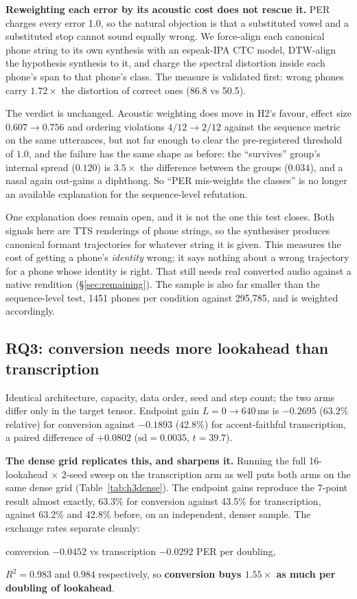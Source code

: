 \documentclass{article}
\begin{document}
\textbf{Reweighting each error by its acoustic cost does not rescue it.} PER
charges every error 1.0, so the natural objection is that a substituted vowel
and a substituted stop cannot sound equally wrong. We force-align each
canonical phone string to its own synthesis with an espeak-IPA CTC model,
DTW-align the hypothesis synthesis to it, and charge the spectral distortion
inside each phone's span to that phone's class. The measure is validated first:
wrong phones carry $1.72\times$ the distortion of correct ones (86.8 vs 50.5).

The verdict is unchanged. Acoustic weighting does move
in H2's favour, effect size $0.607 \rightarrow 0.756$ and ordering violations
$4/12 \rightarrow 2/12$ against the sequence metric on the same utterances,
but not far enough to clear the pre-registered threshold of $1.0$, and the
failure has the same shape as before: the ``survives'' group's internal spread
($0.120$) is $3.5\times$ the difference between the groups ($0.034$), and a
nasal again out-gains a diphthong. So ``PER mis-weights the classes'' is no
longer an available explanation for the sequence-level refutation.



One explanation does remain open, and it is not the one this test closes. Both
signals here are TTS renderings of phone strings, so the synthesiser produces
canonical formant trajectories for whatever string it is given. This measures
the cost of getting a phone's \emph{identity} wrong; it says nothing about a
wrong trajectory for a phone whose identity is right. That still needs real
converted audio against a native rendition (\S\ref{sec:remaining}). The sample
is also far smaller than the sequence-level test, 1451 phones per condition
against 295{,}785, and is weighted accordingly.

\subsection{RQ3: conversion needs more lookahead than transcription}
\label{sec:rq3}

Identical architecture, capacity, data order, seed and step count; the two arms
differ only in the target tensor. Endpoint gain $L{=}0\rightarrow640$\,ms is
$-0.2695$ (63.2\% relative) for conversion against $-0.1893$ (42.8\%) for
accent-faithful transcription, a paired difference of $+0.0802$
($\mathrm{sd}=0.0035$, $t=39.7$).

\textbf{The dense grid replicates this, and sharpens it.} Running the full
16-lookahead $\times$ 2-seed sweep on the transcription arm as well puts both
arms on the same dense grid (Table~\ref{tab:h3dense}). The endpoint gains
reproduce the 7-point result almost exactly, 63.3\% for conversion against
43.5\% for transcription, against 63.2\% and 42.8\% before, on an
independent, denser sample. The exchange rates separate cleanly:
\begin{center}
conversion $-0.0452$ vs transcription $-0.0292$ PER per doubling,
\end{center}
$R^2 = 0.983$ and $0.984$ respectively, so \textbf{conversion buys
$\mathbf{1.55\times}$ as much per doubling of lookahead}.
\end{document}
